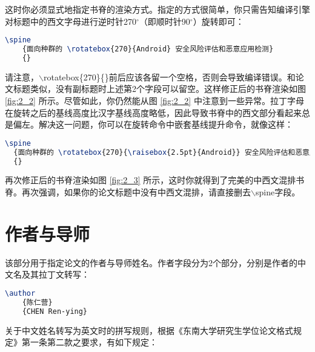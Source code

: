 \noindent 这时你必须显式地指定书脊的渲染方式。指定的方式很简单，你只需告知编译引擎对标题中的西文字母进行逆时针270$^{\circ}$（即顺时针90$^{\circ}$）旋转即可：

\begin{tcolorbox}
\begin{lstlisting}[language=TeX]
\spine
    {面向种群的 \rotatebox{270}{Android} 安全风险评估和恶意应用检测}
    {}
\end{lstlisting}
\end{tcolorbox}

\noindent 请注意，{\codefont $\backslash$rotatebox\{270\}\{\}}前后应该各留一个空格，否则会导致编译错误。和论文标题类似，没有副标题时上述第2个字段可以留空。这样修正后的书脊渲染如图 \ref{fig:2_2} 所示。尽管如此，你仍然能从图 \ref{fig:2_2} 中注意到一些异常。拉丁字母在旋转之后的基线高度比汉字基线高度略低，因此导致书脊中的西文部分看起来总是偏左。解决这一问题，你可以在旋转命令中嵌套基线提升命令，就像这样：

\begin{tcolorbox}
\begin{lstlisting}[language=TeX]
\spine
  {面向种群的 \rotatebox{270}{\raisebox{2.5pt}{Android}} 安全风险评估和恶意应用检测}
  {}
\end{lstlisting}
\end{tcolorbox}

再次修正后的书脊渲染如图 \ref{fig:2_3} 所示，这时你就得到了完美的中西文混排书脊。再次强调，如果你的论文标题中没有中西文混排，请直接删去{\codefont $\backslash$spine}字段。

\section{作者与导师}

该部分用于指定论文的作者与导师姓名。作者字段分为2个部分，分别是作者的中文名及其拉丁文转写：

\begin{tcolorbox}
\begin{lstlisting}[language=TeX]
\author
    {陈仁营}
    {CHEN Ren-ying}
\end{lstlisting}
\end{tcolorbox}

\noindent 关于中文姓名转写为英文时的拼写规则，根据《东南大学研究生学位论文格式规定》\cite{seugs2023rule}第一条第二款之要求，有如下规定：

~


